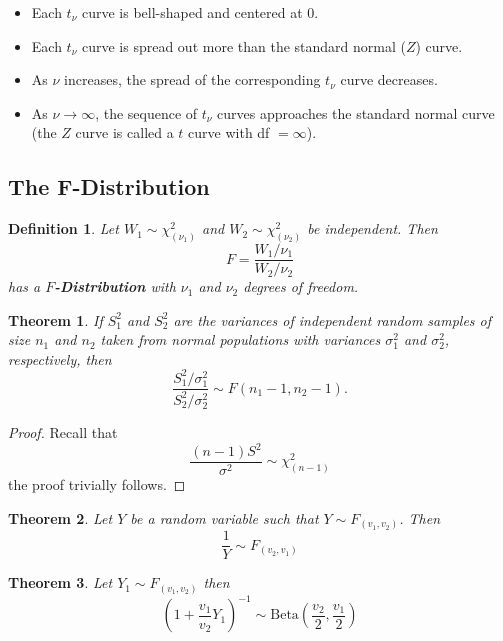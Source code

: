 \documentclass[a4paper,12pt]{article}
\theoremstyle{nonitalic}
\newtheorem{definition}{Definition}[subsection]
\newtheorem{theorem}{Theorem}[subsection]
\begin{document}
    \begin{itemize}
        \item Each $t_\nu$ curve is bell-shaped and centered at 0.
        \item Each $t_\nu$ curve is spread out more than the standard normal ($Z$) curve.
        \item As $\nu$ increases, the spread of the corresponding $t_\nu$ curve decreases.
        \item As $\nu \to \infty$, the sequence of $t_\nu$ curves approaches the standard normal curve (the $Z$ curve is called a $t$ curve with df $=\infty$).
    \end{itemize}

    \newpage

    \subsection{The F-Distribution}

    \begin{definition}
        Let \( W_1 \sim \chi^2_{(\nu_1)} \) and \( W_2 \sim \chi^2_{(\nu_2)} \) be independent. Then
        \[
            F = \frac{W_1 / \nu_1}{W_2 / \nu_2}
        \]
        has a \textbf{\( F \)-Distribution} with \( \nu_1 \) and \( \nu_2 \) degrees of freedom.
    \end{definition}

    \begin{theorem}
        If \( S_1^2 \) and \( S_2^2 \) are the variances of independent random samples of size \( n_1 \) and \( n_2 \) taken from normal populations with variances \( \sigma_1^2 \) and \( \sigma_2^2 \), respectively, then
        \[
        \frac{S_1^2 / \sigma_1^2}{S_2^2 / \sigma_2^2} \sim F(n_1 - 1, n_2 - 1).
        \]        
    \end{theorem}

    \begin{proof}
        Recall that
        \[
            \frac{(n-1)S^2}{\sigma^2} \sim \chi^2_{(n-1)}
        \]
        the proof trivially follows.
    \end{proof}
    
    \begin{theorem}
        Let $Y$ be a random variable such that $Y \sim F_{(v_1, v_2)}$. Then
        \[
            \frac{1}{Y} \sim F_{(v_2, v_1)}
        \]
    \end{theorem}

    \begin{theorem}
        Let $Y_1 \sim F_{(v_1, v_2)}$ then
        \[
            \left(1 + \frac{v_1}{v_2}Y_1\right)^{-1} \sim \text{Beta}\left(\frac{v_2}{2}, \frac{v_1}{2}\right)
        \]
    \end{theorem}
    
\end{document}
